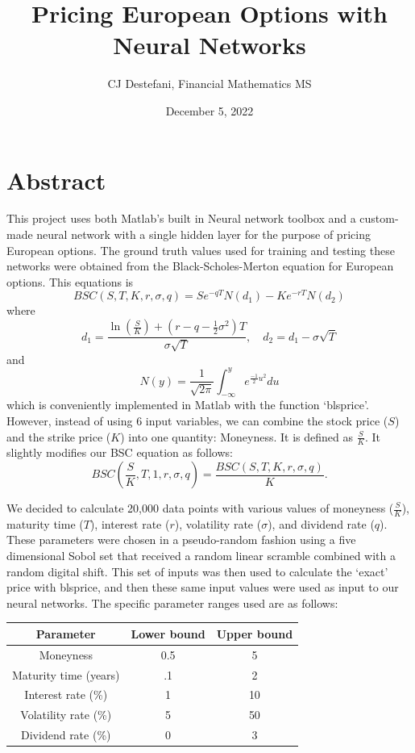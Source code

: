 \documentclass[reqno,14pt]{amsart}
\title{Pricing European Options with Neural Networks}
\author{CJ Destefani, Financial Mathematics MS}
\date{December 5, 2022}
\theoremstyle{plain}
\theoremstyle{definition}
\theoremstyle{remark}
\begin{document}
\maketitle
\section{Abstract}
This project uses both Matlab's built in Neural network toolbox and a custom-made neural network with a single hidden layer for the purpose of pricing European options. The ground truth values used for training and testing these networks were obtained from the Black-Scholes-Merton equation for European options. This equations is 
\begin{equation}
    BSC(S,T,K,r,\sigma,q) = S e^{-qT} N(d_1) - K e^{-r T}N(d_2)
\end{equation}
where 
\begin{equation}
    d_1 = \frac{\ln(\frac{S}{K}) + (r -q -\frac{1}{2}\sigma^2) T}{\sigma \sqrt{T}}, \quad d_2 = d_1 - \sigma \sqrt{T}
\end{equation}
and
\begin{equation}
    N(y) = \frac{1}{\sqrt{2 \pi}} \int_{-\infty}^y e^{\frac{-1}{2} u^2} du
\end{equation}
which is conveniently implemented in Matlab with the function `blsprice'. However, instead of using 6 input variables, we can combine the stock price ($S$) and the strike price ($K$) into one quantity: Moneyness. It is defined as $\frac{S}{K}$. It slightly modifies our BSC equation as follows:
\begin{equation}
    BSC(\frac{S}{K},T,1,r,\sigma,q) = \frac{BSC(S,T,K,r,\sigma,q)}{K}.
\end{equation}

We decided to calculate 20,000 data points with various values of moneyness ($\frac{S}{K}$), maturity time ($T$), interest rate ($r$), volatility rate ($\sigma$), and dividend rate ($q$). These parameters were chosen in a pseudo-random fashion using a five dimensional Sobol set that received a random linear scramble combined with a random digital shift. This set of inputs was then used to calculate the `exact' price with blsprice, and then these same input values were used as input to our neural networks. The specific parameter ranges used are as follows:
\begin{center}
\begin{tabular}{||c c c||} 
 \hline
 Parameter & Lower bound & Upper bound \\ [0.5ex] 
 \hline\hline
 Moneyness & 0.5 & 5 \\ 
 \hline
 Maturity time (years) & .1 & 2 \\
 \hline
 Interest rate (\%) & 1 & 10 \\
 \hline
 Volatility rate (\%) & 5 & 50\\
 \hline
 Dividend rate (\%) & 0 & 3\\
 \hline
\end{tabular}
\end{center}
\end{document}
